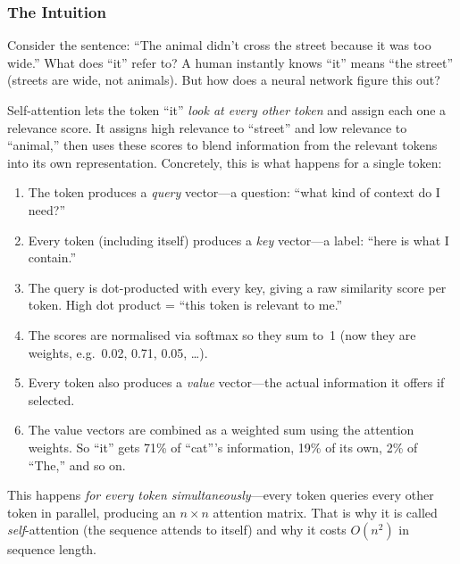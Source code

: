 \subsubsection{The Intuition}

Consider the sentence: ``The animal didn't cross the street because
it was too wide.'' What does ``it'' refer to? A human instantly knows
``it'' means ``the street'' (streets are wide, not animals). But how
does a neural network figure this out?

Self-attention lets the token ``it'' \emph{look at every other token}
and assign each one a relevance score. It assigns high relevance to
``street'' and low relevance to ``animal,'' then uses these scores to
blend information from the relevant tokens into its own representation.
Concretely, this is what happens for a single token:

\begin{enumerate}[leftmargin=2em]
  \item The token produces a \emph{query} vector---a question:
    ``what kind of context do I need?''
  \item Every token (including itself) produces a \emph{key}
    vector---a label: ``here is what I contain.''
  \item The query is dot-producted with every key, giving a raw
    similarity score per token. High dot product = ``this token is
    relevant to me.''
  \item The scores are normalised via softmax so they sum to~1
    (now they are weights, e.g.\ 0.02, 0.71, 0.05, \ldots).
  \item Every token also produces a \emph{value} vector---the actual
    information it offers if selected.
  \item The value vectors are combined as a weighted sum using the
    attention weights. So ``it'' gets 71\% of ``cat'''s
    information, 19\% of its own, 2\% of ``The,'' and so on.
\end{enumerate}

This happens \emph{for every token simultaneously}---every token
queries every other token in parallel, producing an $n \times n$
attention matrix. That is why it is called \emph{self}-attention (the
sequence attends to itself) and why it costs $O(n^2)$ in sequence
length.

